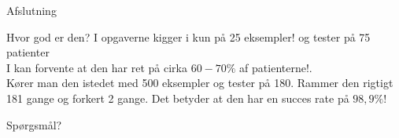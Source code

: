 \documentclass[12pt,t]{beamer}
\begin{document}
    \begin{frame}[t]{Afslutning}
    \begin{block}{Hvor god er den? }
        I opgaverne kigger i kun på \alert{25 eksempler!} og tester på 75
        patienter \\
        \pause
        I kan forvente at den har ret på cirka $60-70\%$ af patienterne!.\\
        \pause
        Kører man den istedet med 500 eksempler og tester på 180. \pause
        Rammer den rigtigt 181 gange og forkert 2 gange. Det betyder at den
        har en succes rate på \alert{$98,9\%$!}
    \end{block}
    \pause
    \centering Spørgsmål?\\
    \end{frame}
\end{document}
